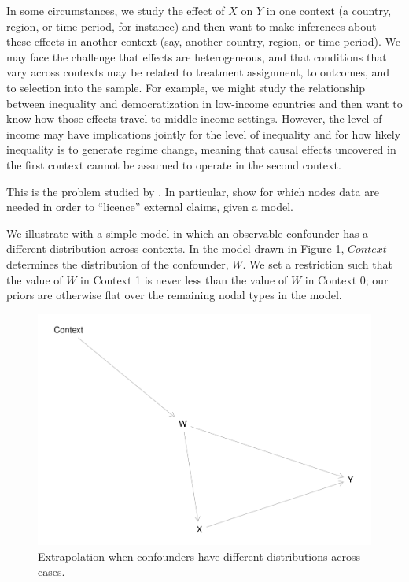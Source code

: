 \documentclass[
  12pt,
]{book}
\begin{document}
In some circumstances, we study the effect of \(X\) on \(Y\) in one context (a country, region, or time period, for instance) and then want to make inferences about these effects in another context (say, another country, region, or time period). We may face the challenge that effects are heterogeneous, and that conditions that vary across contexts may be related to treatment assignment, to outcomes, and to selection into the sample. For example, we might study the relationship between inequality and democratization in low-income countries and then want to know how those effects travel to middle-income settings. However, the level of income may have implications jointly for the level of inequality and for how likely inequality is to generate regime change, meaning that causal effects uncovered in the first context cannot be assumed to operate in the second context.

This is the problem studied by \citet{pearl2014external}. In particular, \citet{pearl2014external} show for which nodes data are needed in order to ``licence'' external claims, given a model.

We illustrate with a simple model in which an observable confounder has a different distribution across contexts. In the model drawn in Figure \ref{fig:extval}, \(Context\) determines the distribution of the confounder, \(W\). We set a restriction such that the value of \(W\) in Context 1 is never less than the value of \(W\) in Context 0; our priors are otherwise flat over the remaining nodal types in the model.

\begin{figure}

{\centering \includegraphics{ii_files/figure-latex/extval-1} 

}

\caption{Extrapolation when confounders have different distributions across cases.}\label{fig:extval}
\end{figure}
\end{document}
